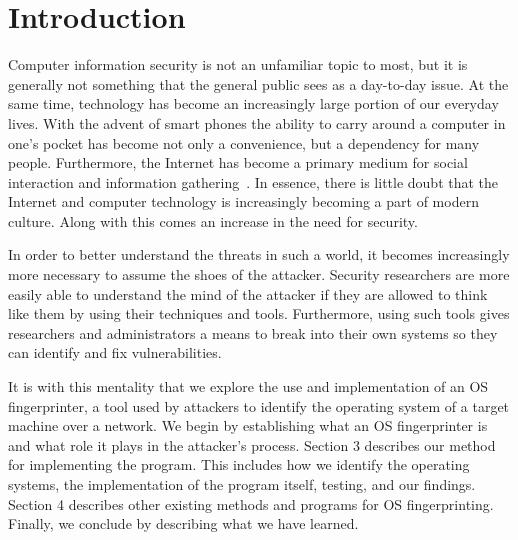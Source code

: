 \section{Introduction}

Computer information security is not an unfamiliar topic to most, but it is generally not something that the general public sees as a day-to-day issue. At the same time, technology has become an increasingly large portion of our everyday lives. With the advent of smart phones the ability to carry around a computer in one’s pocket has become not only a convenience, but a dependency for many people. Furthermore, the Internet has become a primary medium for social interaction and information gathering~\cite{KBK06}. In essence, there is little doubt that the Internet and computer technology is increasingly becoming a part of modern culture. Along with this comes an increase in the need for security.

In order to better understand the threats in such a world, it becomes increasingly more necessary to assume the shoes of the attacker. Security researchers are more easily able to understand the mind of the attacker if they are allowed to think like them by using their techniques and tools. Furthermore, using such tools gives researchers and administrators a means to break into their own systems so they can identify and fix vulnerabilities. 

It is with this mentality that we explore the use and implementation of an OS fingerprinter, a tool used by attackers to identify the operating system of a target machine over a network. We begin by establishing what an OS fingerprinter is and what role it plays in the attacker's process. Section 3 describes our method for implementing the program. This includes how we identify the operating systems, the implementation of the program itself, testing, and our findings. Section 4 describes other existing methods and programs for OS fingerprinting. Finally, we conclude by describing what we have learned.